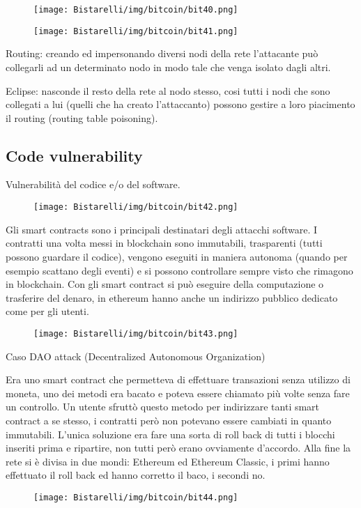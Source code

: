 \begin{figure}[H]
	\centering
    \texttt{[image: Bistarelli/img/bitcoin/bit40.png]}
\end{figure}

\begin{figure}[H]
	\centering
    \texttt{[image: Bistarelli/img/bitcoin/bit41.png]}
\end{figure}

Routing: creando ed impersonando diversi nodi della rete l’attacante può collegarli ad un determinato nodo in
modo tale che venga isolato dagli altri.

\singlespacing

Eclipse: nasconde il resto della rete al nodo stesso, cosi tutti i nodi che sono collegati a lui (quelli che ha creato
l’attaccanto) possono gestire a loro piacimento il routing (routing table poisoning).

\subsection{Code vulnerability}

Vulnerabilità del codice e/o del software.

\begin{figure}[H]
	\centering
    \texttt{[image: Bistarelli/img/bitcoin/bit42.png]}
\end{figure}

Gli smart contracts sono i principali destinatari degli attacchi software.
I contratti una volta messi in blockchain sono immutabili, trasparenti (tutti possono guardare il codice), vengono
eseguiti in maniera autonoma (quando per esempio scattano degli eventi) e si possono controllare sempre visto
che rimagono in blockchain. Con gli smart contract si può eseguire della computazione o trasferire del denaro, in
ethereum hanno anche un indirizzo pubblico dedicato come per gli utenti.

\begin{figure}[H]
	\centering
    \texttt{[image: Bistarelli/img/bitcoin/bit43.png]}
\end{figure}

Caso DAO attack (Decentralized Autonomous Organization)

\singlespacing

Era uno smart contract che permetteva di effettuare transazioni senza utilizzo di moneta, uno dei metodi era
bacato e poteva essere chiamato più volte senza fare un controllo. Un utente sfruttò questo metodo per indirizzare
tanti smart contract a se stesso, i contratti però non potevano essere cambiati in quanto immutabili. L’unica
soluzione era fare una sorta di roll back di tutti i blocchi inseriti prima e ripartire, non tutti però erano ovviamente
d’accordo. Alla fine la rete si è divisa in due mondi: Ethereum ed Ethereum Classic, i primi hanno effettuato il
roll back ed hanno corretto il baco, i secondi no.

\begin{figure}[H]
	\centering
    \texttt{[image: Bistarelli/img/bitcoin/bit44.png]}
\end{figure}

